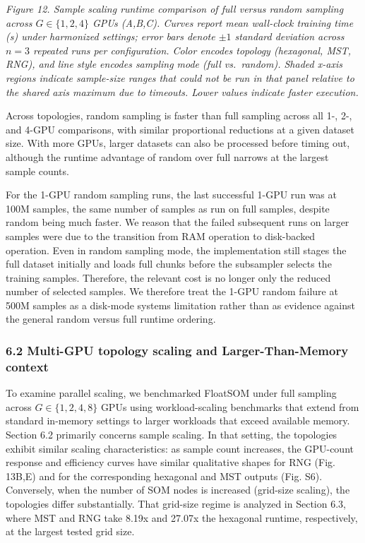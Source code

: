 \documentclass[
]{article}
\providecommand{\DIFadd}[1]{{\protect\color{blue} #1}} %
\providecommand{\DIFaddbegin}{} %
\providecommand{\DIFaddend}{} %
\begin{document}
\emph{Figure  \DIFaddbegin \DIFadd{12. }\DIFaddend Sample scaling runtime comparison of full versus random
sampling across \(G\in\{1,2,4\}\) GPUs (A,B,C). Curves report mean
wall-clock training time (s) under harmonized settings; error bars
denote \(\pm 1\) standard deviation across \(n=3\) repeated runs per
configuration. Color encodes topology (hexagonal, MST, RNG), and line
style encodes sampling mode (full vs.~random). Shaded x-axis regions
indicate sample-size ranges that could not be run in that panel relative
to the shared axis maximum due to timeouts. Lower values indicate faster
execution.}

Across topologies, random sampling is faster than full sampling across
all 1-, 2-, and 4-GPU comparisons, with similar proportional reductions
at a given dataset size. With more GPUs, larger datasets can also be
processed before timing out, although the runtime advantage of random
over full narrows at the largest sample counts.

For the 1-GPU random sampling runs, the last successful 1-GPU run was at
100M samples, the same number of samples as run on full samples, despite
random being much faster. We reason that the failed subsequent runs on
larger samples were due to the transition from RAM operation to
disk-backed operation. Even in random sampling mode, the implementation
still stages the full dataset initially and loads full chunks before the
subsampler selects the training samples. Therefore, the relevant cost is
no longer only the reduced number of selected samples. We therefore
treat the 1-GPU random failure at 500M samples as a disk-mode systems
limitation rather than as evidence against the general random versus
full runtime ordering.

\subsubsection{6.2 Multi-GPU topology scaling and Larger-Than-Memory
context}\label{multi-gpu-topology-scaling-and-larger-than-memory-context}

To examine parallel scaling, we benchmarked FloatSOM under full sampling
across \(G\in\{1,2,4,8\}\) GPUs using workload-scaling benchmarks that
extend from standard in-memory settings to larger workloads that exceed
available memory.  \DIFaddbegin \DIFadd{Section 6.2 primarily concerns sample scaling. In that
setting, the topologies exhibit similar scaling characteristics: as
sample count increases, the GPU-count response and efficiency curves
have similar qualitative shapes for RNG (Fig. 13B,E) and for the
corresponding hexagonal and MST outputs (Fig. S6). Conversely, when the
number of SOM nodes is increased (grid-size scaling), the topologies
differ substantially. That grid-size regime is analyzed in Section 6.3,
where MST and RNG take 8.19x and 27.07x the hexagonal runtime,
respectively, at the largest tested grid size}\DIFaddend .
\end{document}
